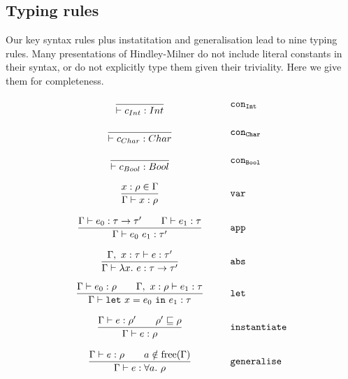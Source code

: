 \documentclass[a4paper,fleqn,oneside,12pt]{report}
\begin{document}
\subsection{Typing rules}

Our key syntax rules plus instatitation and generalisation lead to nine typing rules. Many presentations of Hindley-Milner do not include literal constants in their syntax, or do not explicitly type them given their triviality. Here we give them for completeness.

$$
\begin{array}{ccl}
  \displaystyle\frac{}{\vdash c_{Int} : Int} & \hspace{0.25cm} & \mathtt{con_{Int}}\\ \\
  \displaystyle\frac{}{\vdash c_{Char} : Char} & & \mathtt{con_{Char}}\\ \\
  \displaystyle\frac{}{\vdash c_{Bool} : Bool} & & \mathtt{con_{Bool}}\\ \\
  \displaystyle\frac{x : \rho \in \Gamma}{\Gamma \vdash x : \rho} & & \mathtt{var}\\ \\
  \displaystyle\frac{\Gamma \vdash e_0 : \tau \rightarrow \tau' \quad\quad \Gamma \vdash e_1 : \tau }{\Gamma \vdash e_0\ e_1 : \tau'} & & \mathtt{app}\\ \\
  \displaystyle\frac{\Gamma,\ x : \tau\vdash e : \tau'}{\Gamma \vdash \lambda x.\ e : \tau \rightarrow \tau'} & & \mathtt{abs}\\ \\
  \displaystyle\frac{\Gamma \vdash e_0 : \rho \quad\quad \Gamma,\ x:\rho \vdash e_1 : \tau}{\Gamma \vdash \mathtt{let}\ x = e_0\ \mathtt{in}\ e_1 : \tau} & & \mathtt{let}\\ \\
  \displaystyle\frac{\Gamma \vdash e : \rho' \quad\quad \rho' \sqsubseteq \rho}{\Gamma \vdash e : \rho} & & \mathtt{instantiate}\\ \\
  \displaystyle\frac{\Gamma \vdash e : \rho \quad\quad a \notin \text{free}(\Gamma)}{\Gamma \vdash e : \forall a.\ \rho} & & \mathtt{generalise}\\ \\
\end{array}
$$
\end{document}
